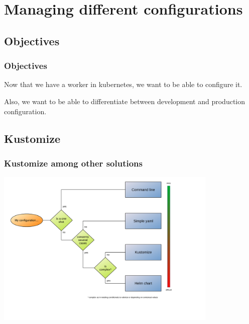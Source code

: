 \section{Managing different configurations}

\subsection{Objectives}

	\begin{frame}
		\frametitle{Objectives}
		
		Now that we have a worker in kubernetes, we want to be able to configure it.
		
		Also, we want to be able to differentiate between development and production configuration.
		
	\end{frame}
	
\subsection{Kustomize}	
	
	\begin{frame}
		\frametitle{Kustomize among other solutions}
		
		\begin{center}
		\includegraphics[height=7.5cm]{../../../resources/color/choiceConfigKind.pdf}
		\end{center}
	\end{frame}
	
